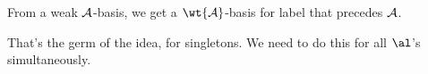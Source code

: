 From a weak $\cal A$-basis, we get a $\wt{\cal A}$-basis for label that precedes $\cal A$.

That's the germ of the idea, for singletons. We need to do this for all $\al$'s simultaneously. %

